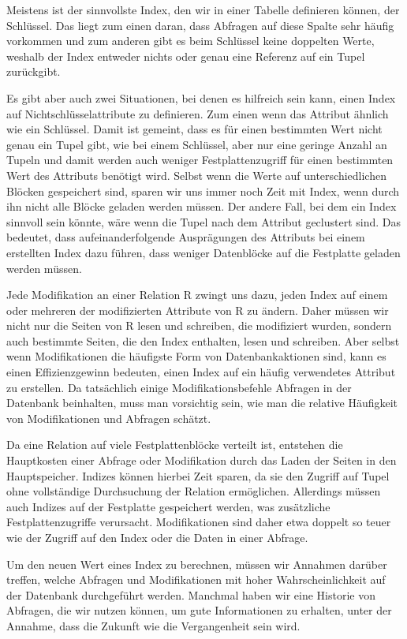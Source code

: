 Meistens ist der sinnvollste Index, den wir in einer Tabelle definieren können, der Schlüssel.
Das liegt zum einen daran, dass Abfragen auf diese Spalte sehr häufig vorkommen und zum anderen gibt es beim Schlüssel keine doppelten Werte, weshalb der Index entweder nichts oder genau eine Referenz auf ein Tupel zurückgibt.

Es gibt aber auch zwei Situationen, bei denen es hilfreich sein kann, einen Index auf Nichtschlüsselattribute zu definieren.
Zum einen wenn das Attribut ähnlich wie ein Schlüssel.
Damit ist gemeint, dass es für einen bestimmten Wert nicht genau ein Tupel gibt, wie bei einem Schlüssel, aber nur eine geringe Anzahl an Tupeln und damit werden auch weniger Festplattenzugriff für einen bestimmten Wert des Attributs benötigt wird.
Selbst wenn die Werte auf unterschiedlichen Blöcken gespeichert sind, sparen wir uns immer noch Zeit mit Index, wenn durch ihn nicht alle Blöcke geladen werden müssen.
Der andere Fall, bei dem ein Index sinnvoll sein könnte, wäre wenn die Tupel nach dem Attribut geclustert sind.
Das bedeutet, dass aufeinanderfolgende Ausprägungen des Attributs bei einem erstellten Index dazu führen, dass weniger Datenblöcke auf die Festplatte geladen werden müssen.

Jede Modifikation an einer Relation R zwingt uns dazu, jeden Index auf einem oder mehreren der modifizierten Attribute von R zu ändern.
Daher müssen wir nicht nur die Seiten von R lesen und schreiben, die modifiziert wurden, sondern auch bestimmte Seiten, die den Index enthalten, lesen und schreiben.
Aber selbst wenn Modifikationen die häufigste Form von Datenbankaktionen sind, kann es einen Effizienzgewinn bedeuten, einen Index auf ein häufig verwendetes Attribut zu erstellen.
Da tatsächlich einige Modifikationsbefehle Abfragen in der Datenbank beinhalten, muss man vorsichtig sein, wie man die relative Häufigkeit von Modifikationen und Abfragen schätzt.

Da eine Relation auf viele Festplattenblöcke verteilt ist, entstehen die Hauptkosten einer Abfrage oder Modifikation durch das Laden der Seiten in den Hauptspeicher.
Indizes können hierbei Zeit sparen, da sie den Zugriff auf Tupel ohne vollständige Durchsuchung der Relation ermöglichen.
Allerdings müssen auch Indizes auf der Festplatte gespeichert werden, was zusätzliche Festplattenzugriffe verursacht.
Modifikationen sind daher etwa doppelt so teuer wie der Zugriff auf den Index oder die Daten in einer Abfrage.

Um den neuen Wert eines Index zu berechnen, müssen wir Annahmen darüber treffen, welche Abfragen und Modifikationen mit hoher Wahrscheinlichkeit auf der Datenbank durchgeführt werden.
Manchmal haben wir eine Historie von Abfragen, die wir nutzen können, um gute Informationen zu erhalten, unter der Annahme, dass die Zukunft wie die Vergangenheit sein wird.

